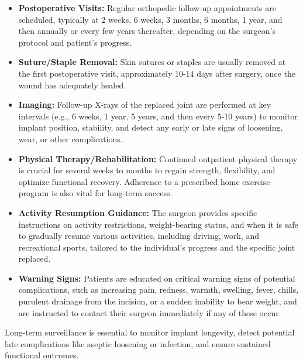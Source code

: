 \begin{itemize}
  \item \textbf{Postoperative Visits:} Regular orthopedic follow-up appointments are scheduled, typically at 2 weeks, 6 weeks, 3 months, 6 months, 1 year, and then annually or every few years thereafter, depending on the surgeon's protocol and patient's progress.
  \item \textbf{Suture/Staple Removal:} Skin sutures or staples are usually removed at the first postoperative visit, approximately 10-14 days after surgery, once the wound has adequately healed.
  \item \textbf{Imaging:} Follow-up X-rays of the replaced joint are performed at key intervals (e.g., 6 weeks, 1 year, 5 years, and then every 5-10 years) to monitor implant position, stability, and detect any early or late signs of loosening, wear, or other complications.
  \item \textbf{Physical Therapy/Rehabilitation:} Continued outpatient physical therapy is crucial for several weeks to months to regain strength, flexibility, and optimize functional recovery. Adherence to a prescribed home exercise program is also vital for long-term success.
  \item \textbf{Activity Resumption Guidance:} The surgeon provides specific instructions on activity restrictions, weight-bearing status, and when it is safe to gradually resume various activities, including driving, work, and recreational sports, tailored to the individual's progress and the specific joint replaced.
  \item \textbf{Warning Signs:} Patients are educated on critical warning signs of potential complications, such as increasing pain, redness, warmth, swelling, fever, chills, purulent drainage from the incision, or a sudden inability to bear weight, and are instructed to contact their surgeon immediately if any of these occur.
\end{itemize}
Long-term surveillance is essential to monitor implant longevity, detect potential late complications like aseptic loosening or infection, and ensure sustained functional outcomes.

